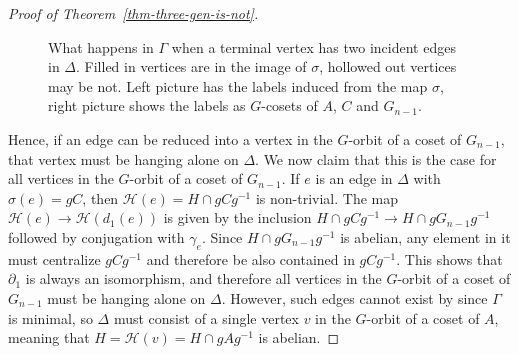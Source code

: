 \documentclass[a4paper]{amsart}
\theoremstyle{definition}
\begin{document}
\begin{proof}[Proof of Theorem~\ref{thm-three-gen-is-not}]
\begin{figure}[!ht]

    \caption{What happens in \(\Gamma\) when a terminal vertex has two incident edges in \(\Delta\). Filled in vertices are in the image of \(\sigma\), hollowed out vertices may be not. Left picture has the labels induced from the map \(\sigma\), right picture shows the labels as \(G\)-cosets of \(A\), \(C\) and \(G_{n-1}\).}
    \label{fig:d0-isomorphism}
\end{figure}

Hence, if an edge can be reduced into a vertex in the \(G\)-orbit of a coset of \(G_{n-1}\), that vertex must be hanging alone on \(\Delta\). We now claim that this is the case for all vertices in the \(G\)-orbit of a coset of \(G_{n-1}\). If \(e\) is an edge in \(\Delta\) with \(\sigma(e) = gC\), then \(\mathcal{H}(e) = H \cap gCg^{-1}\) is non-trivial. The map \(\mathcal{H}(e) \to \mathcal{H}(d_1(e))\) is given by the inclusion \(H \cap gCg^{-1} \to H\cap gG_{n-1}g^{-1}\) followed by conjugation with \(\gamma_e\). Since \(H\cap gG_{n-1}g^{-1}\) is abelian, any element in it must centralize \(gCg^{-1}\) and therefore be also contained in \(gCg^{-1}\). This shows that \(\partial_1\) is always an isomorphism, and therefore all vertices in the \(G\)-orbit of a coset of \(G_{n-1}\) must be hanging alone on \(\Delta\). However, such edges cannot exist by \cite[Lemma 3.1]{KZ2025} since $\Gamma$ is minimal, so \(\Delta\) must consist of a single vertex \(v\) in the \(G\)-orbit of a coset of \(A\), meaning that \(H = \mathcal{H}(v) = H \cap gAg^{-1}\) is abelian.
\end{proof}
\end{document}

